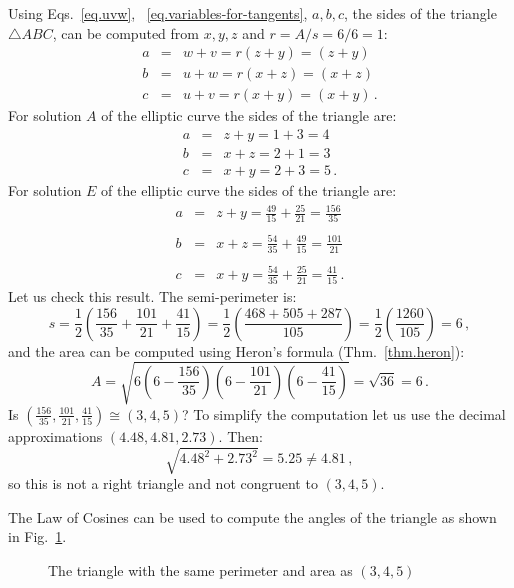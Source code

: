 Using Eqs.~\ref{eq.uvw}, ~\ref{eq.variables-for-tangents}, $a,b,c$, the sides of the triangle $\triangle ABC$, can be computed from $x,y,z$ and $r=A/s=6/6=1$:
%
\begin{eqnarray*}
a&=&w+v = r(z+y)=(z+y)\\
b&=&u+w= r(x+z)=(x+z)\\
c&=&u+v=r(x+y)=(x+y)\,.
\end{eqnarray*}
For solution $A$ of the elliptic curve the sides of the triangle are:
\begin{eqnarray*}
a &=& z+y = 1+3 = 4\\
b &=& x+z = 2+1=3\\
c &=& x+y = 2+3=5\,.
\end{eqnarray*}
For solution $E$ of the elliptic curve the sides of the triangle are:
\begin{eqnarray*}
a &=& z+y = \frac{49}{15} + \frac{25}{21} = \frac{156}{35}\\
&&\\
b &=& x+z = \frac{54}{35} + \frac{49}{15} = \frac{101}{21}\\
&&\\
c &=& x+y = \frac{54}{35} + \frac{25}{21} =\frac{41}{15}\,.
\end{eqnarray*}
Let us check this result. The semi-perimeter is:
\[
s=\frac{1}{2}\left(\frac{156}{35} + \frac{101}{21}+\frac{41}{15}\right) = \frac{1}{2}\left(\frac{468+505+287}{105}\right) = \frac{1}{2}\left(\frac{1260}{105}\right)= 6\,,
\]
and the area can be computed using Heron's formula (Thm.~\ref{thm.heron}):
\[
A= \sqrt{6 \left(6-\frac{156}{35}\right) \left(6-\frac{101}{21}\right) \left(6-\frac{41}{15}\right)}=\sqrt{36} = 6\,.
\]
Is $\left(\frac{156}{35}, \frac{101}{21}, \frac{41}{15}\right)\cong(3,4,5)$? To simplify the computation let us use the decimal approximations $(4.48,4.81,2.73)$. Then:
\[
\sqrt{4.48^2+2.73^2}=5.25\neq 4.81\,,
\]
so this is not a right triangle and not congruent to $(3,4,5)$.

The Law of Cosines can be used to compute the angles of the triangle as shown in Fig.~\ref{f.not-a-right-triangle}.


\begin{figure}[t]
\begin{center}
\end{center}
\caption{The triangle with the same perimeter and area as $(3,4,5)$}\label{f.not-a-right-triangle}
\end{figure}


